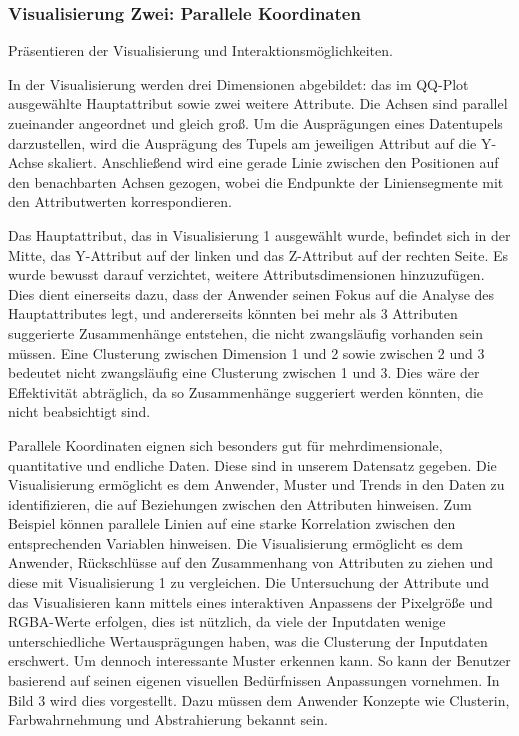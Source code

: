 \documentclass[usegeometry=true]{scrartcl}
\begin{document}
\subsubsection{Visualisierung Zwei: Parallele Koordinaten}
Präsentieren der Visualisierung und Interaktionsmöglichkeiten. 

In der Visualisierung werden drei Dimensionen abgebildet: das im QQ-Plot ausgewählte Hauptattribut sowie zwei weitere Attribute. Die Achsen sind parallel zueinander angeordnet und gleich groß. Um die Ausprägungen eines Datentupels darzustellen, wird die Ausprägung des Tupels am jeweiligen Attribut auf die Y-Achse skaliert. Anschließend wird eine gerade Linie zwischen den Positionen auf den benachbarten Achsen gezogen, wobei die Endpunkte der Liniensegmente mit den Attributwerten korrespondieren.

Das Hauptattribut, das in Visualisierung 1 ausgewählt wurde, befindet sich in der Mitte, das Y-Attribut auf der linken und das Z-Attribut auf der rechten Seite. Es wurde bewusst darauf verzichtet, weitere Attributsdimensionen hinzuzufügen. Dies dient einerseits dazu, dass der Anwender seinen Fokus auf die Analyse des Hauptattributes legt, und andererseits könnten bei mehr als 3 Attributen suggerierte Zusammenhänge entstehen, die nicht zwangsläufig vorhanden sein müssen. Eine Clusterung zwischen Dimension 1 und 2 sowie zwischen 2 und 3 bedeutet nicht zwangsläufig eine Clusterung zwischen 1 und 3. Dies wäre der Effektivität abträglich, da so Zusammenhänge suggeriert werden könnten, die nicht beabsichtigt sind.

Parallele Koordinaten eignen sich besonders gut für mehrdimensionale, quantitative und endliche Daten. Diese sind in unserem Datensatz gegeben. Die Visualisierung ermöglicht es dem Anwender, Muster und Trends in den Daten zu identifizieren, die auf Beziehungen zwischen den Attributen hinweisen. Zum Beispiel können parallele Linien auf eine starke Korrelation zwischen den entsprechenden Variablen hinweisen. Die Visualisierung ermöglicht es dem Anwender, Rückschlüsse auf den Zusammenhang von Attributen zu ziehen und diese mit Visualisierung 1 zu vergleichen. Die Untersuchung der Attribute und das Visualisieren kann mittels eines interaktiven Anpassens der Pixelgröße und RGBA-Werte erfolgen, dies ist nützlich, da viele der Inputdaten wenige unterschiedliche Wertausprägungen haben, was die Clusterung der Inputdaten erschwert. Um dennoch interessante Muster erkennen kann. So kann der Benutzer basierend auf seinen eigenen visuellen Bedürfnissen Anpassungen vornehmen. In Bild 3 wird dies vorgestellt. Dazu müssen dem Anwender Konzepte wie Clusterin, Farbwahrnehmung  und Abstrahierung bekannt sein.
\end{document}
